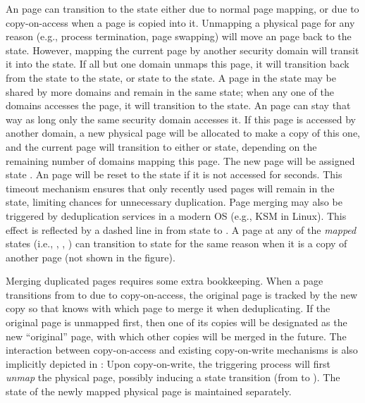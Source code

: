 An \unmapped page can transition to the \exclusive state either due to
normal page mapping, or due to copy-on-access when a page is copied
into it.  Unmapping a physical page for any reason (e.g., process
termination, page swapping) will move an \exclusive page back to the
\unmapped state. However, mapping the current \exclusive page by
another security domain will transit it into the \shared state.  If
all but one domain unmaps this page, it will transition back from the
\shared state to the \exclusive state, or \accessed state to the
\exclusive state.  A page in the \shared state may be shared by more
domains and remain in the same state; when any one of the domains
accesses the page, it will transition to the \accessed state. An
\accessed page can stay that way as long only the same security domain
accesses it.  If this page is accessed by another domain, a new
physical page will be allocated to make a copy of this one, and the
current page will transition to either \exclusive or \shared state,
depending on the remaining number of domains mapping this page. The
new page will be assigned state \exclusive.  An \accessed page will be
reset to the \shared state if it is not accessed for \accessedTimeout
seconds. This timeout mechanism ensures that only recently used pages
will remain in the \accessed state, limiting chances for unnecessary
duplication.
Page merging may also be triggered by deduplication services in a
modern \gls{OS} (e.g., \gls{KSM} in Linux).  This effect is reflected by a dashed
line in  from state \exclusive to \shared.  A page
at any of the \textit{mapped} states (i.e., \exclusive, \shared,
\accessed) can transition to \unmapped state for the same reason when
it is a copy of another page (not shown in the figure).

Merging duplicated pages requires some extra bookkeeping. When
a page transitions from \unmapped to \exclusive due to copy-on-access,
the original page is tracked by the new copy so that \cachebar knows
with which page to merge it when deduplicating.  If
the original page is unmapped first, then one of its
copies will be designated as the new ``original''
page, with which other copies will be merged in the future. The interaction between copy-on-access
and existing copy-on-write mechanisms is also implicitly depicted in
: Upon copy-on-write, the triggering process will first
\textit{unmap} the physical page, possibly inducing a state transition (from
\shared to \exclusive). The state of the newly mapped physical page is
maintained separately.

